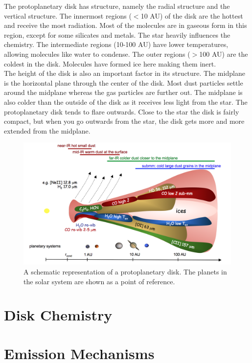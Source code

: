 \documentclass[twoside, single, authoryear, semicolon]{lion-msc}
\newcommand{\3}{$_3$}
\newcommand{\2}{$_2$}
\begin{document}
The protoplanetary disk has structure, namely the radial structure and the vertical structure. The innermost regions ($<$10 AU) of the disk are the hottest and receive the most radiation. Most of the molecules are in gaseous form in this region, except for some silicates and metals. The star heavily influences the chemistry. The intermediate regions (10-100 AU) have lower temperatures, allowing molecules like water to condense. The outer regions ($>$100 AU) are the coldest in the disk. Molecules have formed ice here making them inert. \\
The height of the disk is also an important factor in its structure. The midplane is the horizontal plane through the center of the disk. Most dust particles settle around the midplane whereas the gas particles are further out. The midplane is also colder than the outside of the disk as it receives less light from the star. The protoplanetary disk tends to flare outwards. Close to the star the disk is fairly compact, but when you go outwards from the star, the disk gets more and more extended from the midplane. 

\begin{figure}[!ht]
    \centering
    \includegraphics[width=\linewidth]{Figures/disk-sketch.png}
    \caption{A schematic representation of a protoplanetary disk. The planets in the solar system are shown as a point of reference. \cite{inproceedings}}
    \label{fig:enter-label}
\end{figure}

\section{Disk Chemistry}

\section{Emission Mechanisms}
\end{document}
